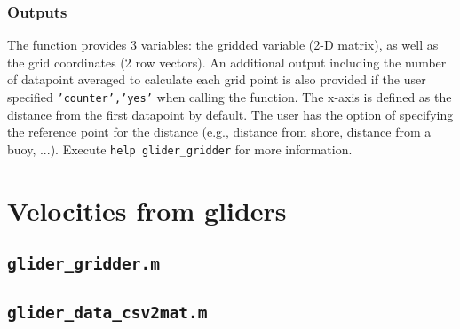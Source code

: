 \documentclass[11pt,A4]{report}
\begin{document}
\subsubsection{Outputs}

The function provides 3 variables: the gridded variable (2-D matrix), as well as the grid coordinates (2 row vectors). An additional output including the number of datapoint averaged to calculate each grid point is also provided if the user specified \texttt{'counter','yes'} when calling the function.
The x-axis is defined as the distance from the first datapoint by default. The user has the option of specifying the reference point for the distance (e.g., distance from shore, distance from a buoy, ...). Execute \texttt{help glider\_gridder} for more information.

\section{Velocities from gliders}

\subsection{\texttt{glider\_gridder.m}}
\subsection{\texttt{glider\_data\_csv2mat.m}}

\pagebreak
%

\pagebreak


\end{document}
